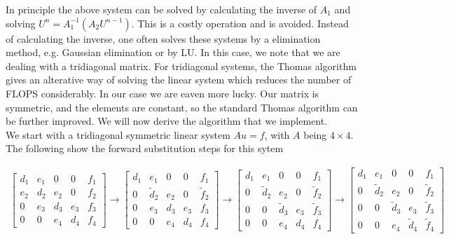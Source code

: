 \documentclass{article}
\begin{document}
In principle the above system can be solved by calculating the inverse of $A_1$ and solving $U^n = A_1^{-1} (A_2 U^{n-1})$. This is a costly operation and is avoided. Instead of calculating the inverse, one often solves these systems by a elimination method, e.g. Gaussian elimination or by LU. In this case, we note that we are dealing with a tridiagonal matrix. For tridiagonal systems, the Thomas algorithm gives an alterative way of solving the linear system which reduces the number of FLOPS considerably. In our case we are eaven more lucky. Our matrix is symmetric, and the elements are constant, so the standard Thomas algorithm can be further improved. We will now derive the algorithm that we implement.\\

We start with a tridiagonal symmetric linear system $Au =f$, with $A$ being $4 \times 4$. The following show the forward substitution steps for this sytem

\begin{subequations}
	\begin{align}
		\begin{bmatrix}
		     d_1 & e_1 & 0 & 0 & f_1\\
		      e_2 & d_2 & e_2 & 0 & f_2\\
			 0 & e_3 & d_3 & e_3 & f_3\\
	         0 & 0 & e_4 & d_4 & f_4
		\end{bmatrix}
		\rightarrow
		\begin{bmatrix}
		d_1 & e_1 & 0 & 0 & f_1\\
		0 & \tilde{d}_2 & e_2 & 0 & \tilde{f}_2\\
		0 & e_3 & d_3 & e_3 & f_3\\
		0 & 0 & e_4 & d_4 & f_4
		\end{bmatrix}
		\rightarrow
		\begin{bmatrix}
		d_1 & e_1 & 0 & 0 & f_1\\
		0 & \tilde{d}_2 & e_2 & 0 &\tilde{f}_2 \\
		0 & 0 & \tilde{d}_3 & e_3 & \tilde{f}_3\\
		0 & 0 & e_4 & d_4 & f_4
		\end{bmatrix}
		\rightarrow
		\begin{bmatrix}
		d_1 & e_1 & 0 & 0 & f_1\\
		0 & \tilde{d}_2 & e_2 & 0 &\tilde{f}_2 \\
		0 & 0 & \tilde{d}_3 & e_3 & \tilde{f}_3\\
		0 & 0 & e_4 & \tilde{d}_4 & \tilde{f}_4
		\end{bmatrix}
	\end{align}\label{eq:thomas1}
\end{subequations}
\end{document}
